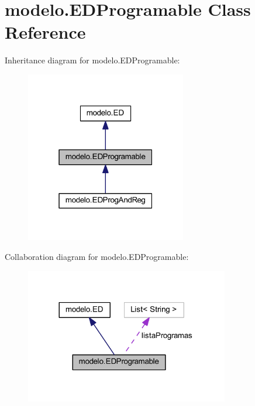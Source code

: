\hypertarget{classmodelo_1_1_e_d_programable}{}\section{modelo.\+E\+D\+Programable Class Reference}
\label{classmodelo_1_1_e_d_programable}


Inheritance diagram for modelo.\+E\+D\+Programable\+:
\nopagebreak
\begin{figure}[H]
\begin{center}
\leavevmode
\includegraphics[width=199pt]{classmodelo_1_1_e_d_programable__inherit__graph}
\end{center}
\end{figure}


Collaboration diagram for modelo.\+E\+D\+Programable\+:
\nopagebreak
\begin{figure}[H]
\begin{center}
\leavevmode
\includegraphics[width=252pt]{classmodelo_1_1_e_d_programable__coll__graph}
\end{center}
\end{figure}
